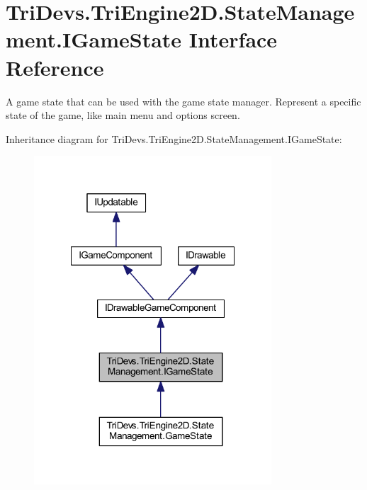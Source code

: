 \hypertarget{interface_tri_devs_1_1_tri_engine2_d_1_1_state_management_1_1_i_game_state}{\section{Tri\-Devs.\-Tri\-Engine2\-D.\-State\-Management.\-I\-Game\-State Interface Reference}
\label{interface_tri_devs_1_1_tri_engine2_d_1_1_state_management_1_1_i_game_state}
}


A game state that can be used with the game state manager. Represent a specific state of the game, like main menu and options screen.  




Inheritance diagram for Tri\-Devs.\-Tri\-Engine2\-D.\-State\-Management.\-I\-Game\-State\-:
\nopagebreak
\begin{figure}[H]
\begin{center}
\leavevmode
\includegraphics[width=251pt]{interface_tri_devs_1_1_tri_engine2_d_1_1_state_management_1_1_i_game_state__inherit__graph}
\end{center}
\end{figure}


